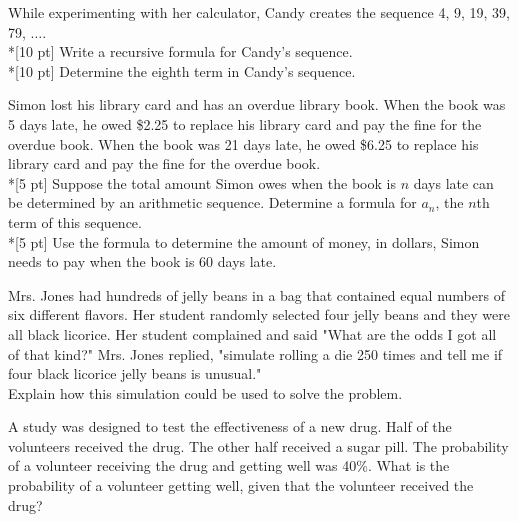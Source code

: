 \item %
While experimenting with her calculator, Candy creates the sequence 4, 9, 19, 39, 79, $\ldots$.\\*[10 pt]
Write a recursive formula for Candy's sequence.\\*[10 pt]
Determine the eighth term in Candy's sequence.

\item %
Simon lost his library card and has an overdue library book. When the book was 5 days late, he owed \$2.25 to replace his library card and pay the fine for the overdue book. When the book was 21 days late, he owed \$6.25 to replace his library card and pay the fine for the overdue book.\\*[5 pt]
Suppose the total amount Simon owes when the book is $n$ days late can be determined by an arithmetic sequence. Determine a formula for $a_n$, the $n$th term of this sequence.\\*[5 pt]
Use the formula to determine the amount of money, in dollars, Simon needs to pay when the book is 60 days late.


\item %
Mrs. Jones had hundreds of jelly beans in a bag that contained equal numbers of six different flavors. Her student randomly selected four jelly beans and they were all black licorice.
Her student complained and said "What are the odds I got all of that kind?" Mrs. Jones replied, "simulate rolling a die 250 times and tell me if four black licorice jelly beans is unusual."\\[10pt]
Explain how this simulation could be used to solve the problem.\\

\item %
A study was designed to test the effectiveness of a new drug. Half of the volunteers received the drug. The other half received a sugar pill. The probability of a volunteer receiving the drug and getting well was 40\%. What is the probability of a volunteer getting well, given that the volunteer received the drug?
